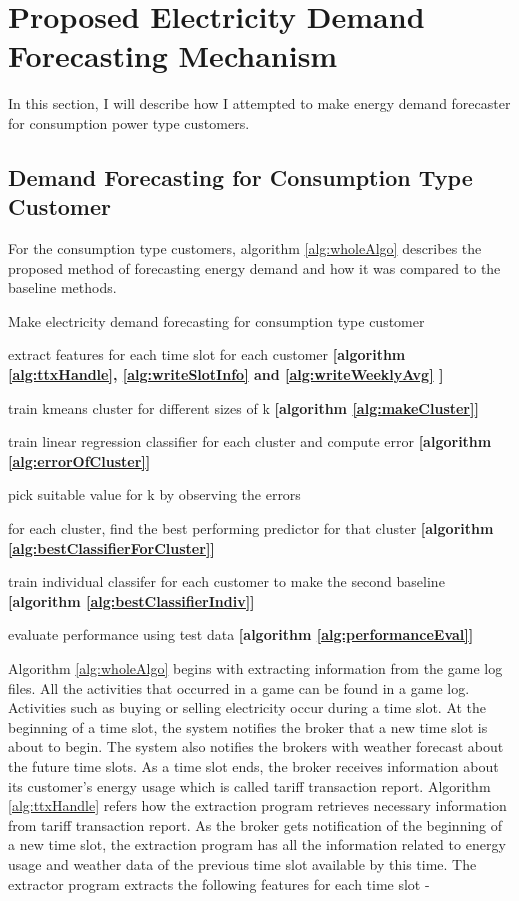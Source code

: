 \section{Proposed Electricity Demand Forecasting Mechanism}

In this section, I will describe how I attempted to make energy demand forecaster for consumption power type customers.

\subsection{Demand Forecasting for Consumption Type Customer}
For the consumption type customers, algorithm \ref{alg:wholeAlgo} describes the proposed method of forecasting energy demand and how it was compared to the baseline methods. 


\begin{algorithm}
\caption{Make electricity demand forecasting for consumption type customer}
\begin{algorithmic}[1]
\STATE extract features for each time slot for each customer \textbf{[algorithm \ref{alg:ttxHandle}, \ref{alg:writeSlotInfo} and \ref{alg:writeWeeklyAvg} ] }

\STATE train kmeans cluster for different sizes of k \textbf{[algorithm \ref{alg:makeCluster}]} 

\STATE train linear regression classifier for each cluster and compute error \textbf{[algorithm \ref{alg:errorOfCluster}]}

\STATE pick suitable value for k by observing the errors
 
\STATE for each cluster, find the best performing predictor for that cluster \textbf{[algorithm \ref{alg:bestClassifierForCluster}]} 

\STATE train individual classifer for each customer to make the second baseline \textbf{[algorithm \ref{alg:bestClassifierIndiv}]}

\STATE evaluate performance using test data \textbf{[algorithm \ref{alg:performanceEval}]}  
\end{algorithmic}
\label{alg:wholeAlgo}
\end{algorithm}

Algorithm \ref{alg:wholeAlgo} begins with extracting information from the game log files. All the activities that occurred in a game can be found in a game log.  Activities such as buying or selling electricity occur during a time slot. At the beginning of a time slot, the system notifies the broker that a new time slot is about to begin. The system also notifies the brokers with weather forecast about the future time slots. As a time slot ends, the broker receives information about its customer's energy usage which is called tariff transaction report. Algorithm \ref{alg:ttxHandle} refers how the extraction program retrieves necessary information from tariff transaction report. As the broker gets notification of the beginning of a new time slot, the extraction program has all the information related to energy usage and weather data of the previous time slot available by this time. The extractor program extracts the following features for each time slot -
 
